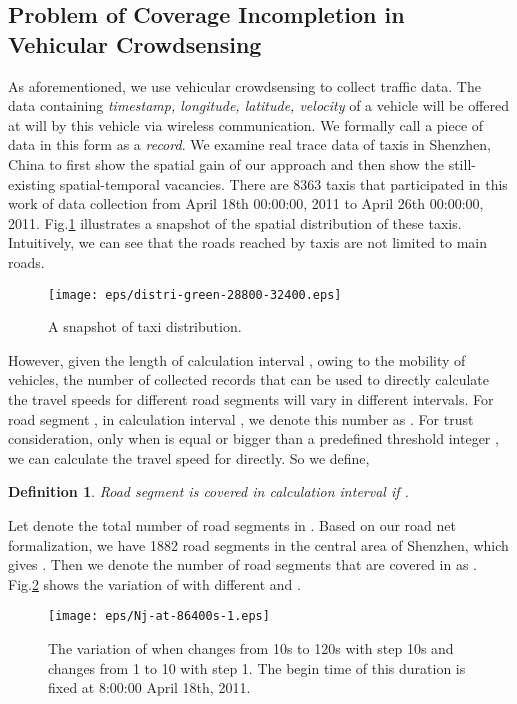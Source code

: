 \documentclass[twocolumn,10pt,final,conference]{IEEEtran}
\newtheorem{defn}{Definition}
\begin{document}
\subsection{Problem of Coverage Incompletion in Vehicular Crowdsensing}\label{section-sub-Problem of coverage incompletion in vecicular crowdsensing}
As aforementioned, we use vehicular crowdsensing to collect traffic data. The data containing \emph{timestamp, longitude, latitude, velocity} of a vehicle will be offered at will by this vehicle via wireless communication. We formally call a piece of data in this form as a \emph{record}. We examine real trace data of taxis in Shenzhen, China to first show the spatial gain of our approach and then show the still-existing spatial-temporal vacancies. There are 8363 taxis that participated in this work of data collection from April 18th 00:00:00, 2011 to April 26th 00:00:00, 2011.
Fig.\ref{fig-SnapShot of Taxi Distribution} illustrates a snapshot of the spatial distribution of these taxis. Intuitively, we can see that the roads reached by taxis are not limited to main roads.

\begin{figure}[h]
  \centering
\texttt{[image: eps/distri-green-28800-32400.eps]}
  \caption{A snapshot of taxi distribution.}
  \label{fig-SnapShot of Taxi Distribution}
\end{figure}

However, given the length of calculation interval , owing to the mobility of vehicles, the number of collected records that can be used to directly calculate the travel speeds for different road segments will vary in different intervals. For  road segment , in  calculation interval , we denote this number as .
For trust consideration, only when  is equal or bigger than a predefined threshold integer , we can calculate the travel speed for  directly.
So we define,
\begin{defn}\label{defn-Covered}
Road segment  is \emph{covered} in  calculation interval  if .
\end{defn}

Let  denote the total number of road segments in . Based on our road net formalization, we have 1882 road segments in the  central area of Shenzhen, which gives . Then we denote the number of road segments that are covered  in  as . Fig.\ref{fig-Nc Variation} shows the variation of  with different  and .

\begin{figure}[h]
  \centering
\texttt{[image: eps/Nj-at-86400s-1.eps]}
  \caption{The variation of  when  changes from 10s to 120s with step 10s and  changes from 1 to 10 with step 1. The begin time of this duration is fixed at 8:00:00 April 18th, 2011.}
  \label{fig-Nc Variation}
\end{figure}
\end{document}
